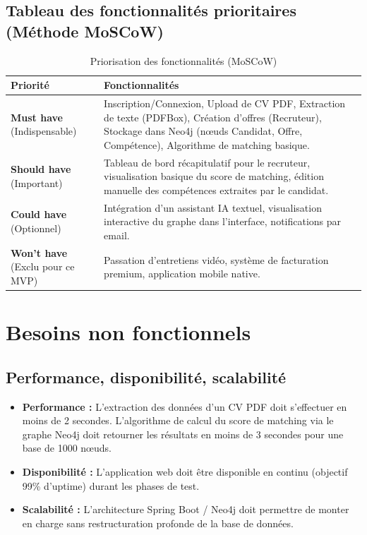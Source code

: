 \documentclass[12pt,a4paper]{report}
\begin{document}
\subsection{Tableau des fonctionnalités prioritaires (Méthode MoSCoW)}

\begin{table}[h]
\centering
\begin{tabular}{|p{2cm}|p{12cm}|}
\hline
\textbf{Priorité} & \textbf{Fonctionnalités} \\
\hline
\textbf{Must have} (Indispensable) & Inscription/Connexion, Upload de CV PDF, Extraction de texte (PDFBox), Création d'offres (Recruteur), Stockage dans Neo4j (nœuds Candidat, Offre, Compétence), Algorithme de matching basique. \\
\hline
\textbf{Should have} (Important) & Tableau de bord récapitulatif pour le recruteur, visualisation basique du score de matching, édition manuelle des compétences extraites par le candidat. \\
\hline
\textbf{Could have} (Optionnel) & Intégration d'un assistant IA textuel, visualisation interactive du graphe dans l'interface, notifications par email. \\
\hline
\textbf{Won't have} (Exclu pour ce MVP) & Passation d'entretiens vidéo, système de facturation premium, application mobile native. \\
\hline
\end{tabular}
\caption{Priorisation des fonctionnalités (MoSCoW)}
\end{table}

\section{Besoins non fonctionnels}

\subsection{Performance, disponibilité, scalabilité}
\begin{itemize}
    \item \textbf{Performance :} L'extraction des données d'un CV PDF doit s'effectuer en moins de 2 secondes. L'algorithme de calcul du score de matching via le graphe Neo4j doit retourner les résultats en moins de 3 secondes pour une base de 1000 nœuds.
    \item \textbf{Disponibilité :} L'application web doit être disponible en continu (objectif 99\% d'uptime) durant les phases de test.
    \item \textbf{Scalabilité :} L'architecture Spring Boot / Neo4j doit permettre de monter en charge sans restructuration profonde de la base de données.
\end{itemize}
\end{document}
